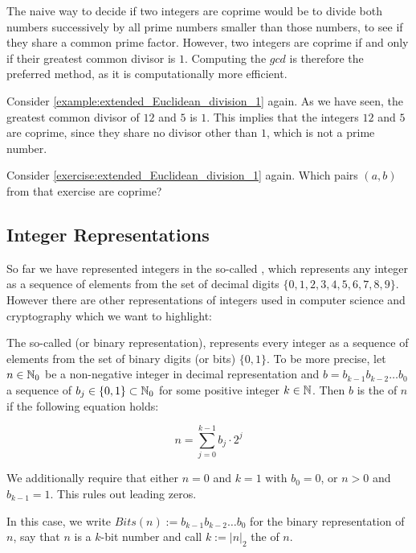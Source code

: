 The naive way to decide if two integers are coprime would be to divide both numbers successively by all prime numbers smaller than those numbers, to see if they share a common prime factor. However, two integers are coprime if and only if their greatest common divisor is $1$.  Computing the $gcd$ is therefore the preferred method, as it is computationally more efficient.

\begin{example} Consider \examplename{} \ref{example:extended_Euclidean_division_1} again. As we have seen, the greatest common divisor of $12$ and $5$ is $1$. This implies that the integers $12$ and $5$ are coprime, since they share no divisor other than $1$, which is not a prime number.
\end{example}
\begin{exercise} Consider \exercisename{} \ref{exercise:extended_Euclidean_division_1} again. Which pairs $(a,b)$ from that exercise are coprime?
\end{exercise}
\subsection{Integer Representations}
\label{sec:integer-rep}
So far we have represented integers in the so-called , which represents any integer as a sequence of elements from the set of decimal digits $\{0,1,2,3,4,5,6,7,8,9\}$. However there are other representations of integers used in computer science and cryptography which we want to highlight:

The so-called  (or binary representation), represents every integer as a sequence of elements from the set of binary digits (or bits) $\{0,1\}$. To be more precise, let $n\in\mathbb{N}_0$ be a non-negative integer in decimal representation and $b=b_{k-1}b_{k-2}\ldots b_{0}$ a sequence of  $b_j\in\{0,1\}\subset\mathbb{N}_0$ for some positive integer $k\in\mathbb{N}$. Then $b$ is the  of $n$ if the following equation holds:

\begin{equation}
\label{def:binary_representation_integer}
n = \sum_{j=0}^{k-1} b_j\cdot 2^j
\end{equation}

We additionally require that either $n=0$ and $k=1$ with $b_0=0$, or $n>0$ and $b_{k-1}=1$. This rules out leading zeros. 

In this case, we write $Bits(n):= b_{k-1}b_{k-2}\ldots b_{0}$ for the binary representation of $n$, say that $n$ is a $k$-bit number and call $k:= |n|_2$ the  of $n$. 

